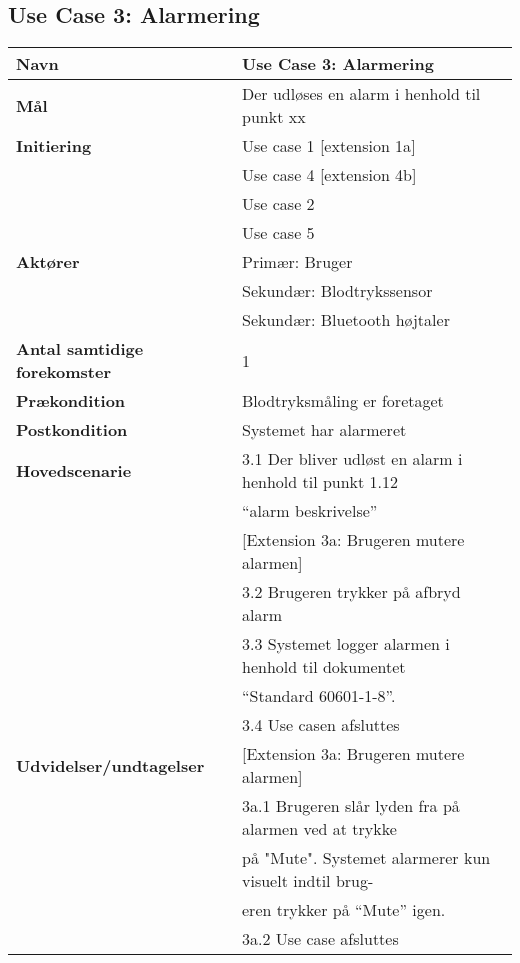 \vspace{1 cm}
\subsection{Use Case 3: Alarmering}
\begin{table}[h!]
	\begin{tabular}{l|l}
		\rowcolor[HTML]{A9D9F9} 
		\textbf{Navn} & Use Case 3: Alarmering \\ \hline
		\textbf{Mål} & Der udløses en alarm i henhold til punkt xx \\ \hline
		\rowcolor[HTML]{A9D9F9} 
		\textbf{Initiering} & Use case 1 {[}extension 1a{]} \\
		\rowcolor[HTML]{A9D9F9} 
		\textbf{} & Use case 4 {[}extension 4b{]} \\
		\rowcolor[HTML]{A9D9F9} 
		\textbf{} & Use case 2 \\
		\rowcolor[HTML]{A9D9F9} 
		\textbf{} & Use case 5 \\ \hline
		\textbf{Aktører} & Primær: Bruger \\
		\textbf{} & Sekundær: Blodtrykssensor \\
		\textbf{} & Sekundær: Bluetooth højtaler \\ \hline
		\rowcolor[HTML]{A9D9F9} 
		\textbf{Antal samtidige forekomster} & 1 \\ \hline
		\textbf{Prækondition} & Blodtryksmåling er foretaget \\ \hline
		\rowcolor[HTML]{A9D9F9} 
		\textbf{Postkondition} & Systemet har alarmeret \\ \hline
		\textbf{Hovedscenarie} & 3.1 Der bliver udløst en alarm i henhold til punkt 1.12 \\
		\textbf{} & “alarm beskrivelse” \\
		\textbf{} & {[}Extension 3a: Brugeren mutere alarmen{]} \\
		\textbf{} & 3.2 Brugeren trykker på afbryd alarm \\
		\textbf{} & 3.3 Systemet logger alarmen i henhold til dokumentet \\
		\textbf{} & “Standard 60601-1-8”. \\
		\textbf{} & 3.4 Use casen afsluttes \\ \hline
		\rowcolor[HTML]{A9D9F9} 
		\textbf{Udvidelser/undtagelser} & {[}Extension 3a: Brugeren mutere alarmen{]} \\
		\rowcolor[HTML]{A9D9F9} 
		& 3a.1 Brugeren slår lyden fra på alarmen ved at trykke\\
		\rowcolor[HTML]{A9D9F9} 
		& på "Mute". Systemet alarmerer kun visuelt indtil brug- \\
		\rowcolor[HTML]{A9D9F9} 
		& eren trykker på “Mute” igen. \\
		\rowcolor[HTML]{A9D9F9} 
		& 3a.2 Use case afsluttes
	\end{tabular}
\end{table}